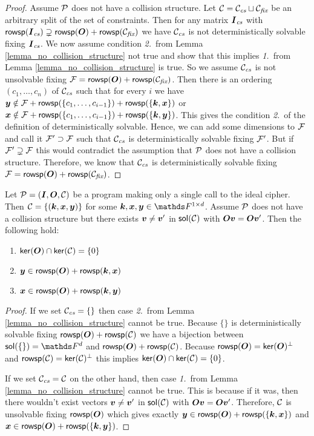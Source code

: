 \begin{proof}
    Assume $\P$ does not have a collision structure.
    Let $\C = \Ccs \sqcup \Cfix$ be an arbitrary split of the set of constraints.
    Then for any matrix $\Ics$ with $\rowsp(\Ics) \supsetneq \rowsp(\O) + \rowsp(\Cfix)$ we have
    $\Ccs$ is not deterministically solvable fixing $\Ics$.
    We now assume condition \textit{2.}~from Lemma \ref{lemma_no_collision_structure} not true
    and show that this implies \textit{1.}~from Lemma \ref{lemma_no_collision_structure} is true.
    So we assume $\Ccs$ is not unsolvable fixing $\Fix = \rowsp(\O) + \rowsp(\Cfix)$.
    Then there is an ordering $(c_1, \dots, c_n)$ of $\Ccs$ such that for every $i$ we have
    $\vy \notin \Fix + \rowsp(\{\dts c {i-1}\}) + \rowsp(\{ \vk, \vx \})$ or
    $\vx \notin \Fix + \rowsp(\{\dts c {i-1}\}) + \rowsp(\{ \vk, \vy \})$.
    This gives the condition \textit{2.}~of the definition of deterministically solvable.
    Hence, we can add some dimensions to $\Fix$ and call it $\Fix' \supset \Fix$ such that
    $\Ccs$ is deterministically solvable fixing $\Fix'$.
    But if $\Fix' \supsetneq \Fix$ this would contradict the assumption that $\P$ does not have a collision structure.
    Therefore, we know that $\Ccs$ is deterministically solvable fixing $\Fix = \rowsp(\O) + \rowsp(\Cfix)$.
\end{proof}

\begin{corollary}
\label{corollary:single_query_properties}
    Let $\P = (\I, \O, \C)$ be a program making only a single call to the ideal cipher.
    Then $\C = \{ (\vk, \vx, \vy)\}$ for some $\vk, \vx, \vy \in \Frowsp$.
    Assume $\P$ does not have a collision structure but there exists $\vv \neq \vv'$ in $\sol(\C)$ with $\O\vv = \O\vv'$.
    Then the following hold:
    \begin{enumerate}
    \item $\ker(\O) \cap \ker(\C) = \{0\}$
    \item $\vy \in \rowsp(\O) + \rowsp(\vk, \vx)$
    \item $\vx \in \rowsp(\O) + \rowsp(\vk, \vy)$
    \end{enumerate}
\end{corollary}
\begin{proof}
    If we set $\Ccs = \{\}$ then case \textit{2.}~from Lemma \ref{lemma_no_collision_structure} cannot be true.
    Because $\{\}$ is deterministically solvable fixing $\rowsp(\O) + \rowsp(\C)$ we have a bijection between
    $\sol(\{\}) = \Fsp$ and $\rowsp(\O) + \rowsp(\C)$.
    Because $\rowsp(\O) = \ker(\O)^\perp$ and $\rowsp(\C) = \ker(\C)^\perp$
    this implies $\ker(\O) \cap \ker(\C) = \{0\}$.
    
    If we set $\Ccs = \C$ on the other hand,
    then case \textit{1.}~from Lemma \ref{lemma_no_collision_structure} cannot be true.
    This is because if it was, then there wouldn't exist vectors $\vv \neq \vv'$ in $\sol(\C)$ with $\O\vv = \O\vv'$.
    Therefore, $\C$ is unsolvable fixing $\rowsp(\O)$ which gives exactly 
    $\vy \in \rowsp(\O) + \rowsp(\{\vk, \vx\})$ and
    $\vx \in \rowsp(\O) + \rowsp(\{\vk, \vy\})$.
\end{proof}


